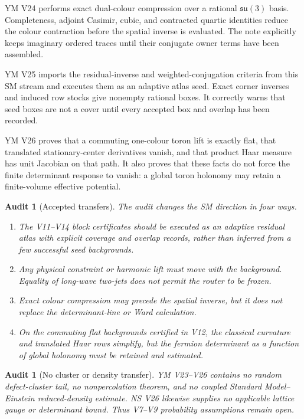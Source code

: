 \documentclass[11pt]{article}
\newtheorem{audit}[theorem]{Audit}
\begin{document}
YM V24 performs exact dual-colour compression over a rational
\(\mathfrak{su}(3)\) basis.  Completeness, adjoint Casimir, cubic, and
contracted quartic identities reduce the colour contraction before the
spatial inverse is evaluated.  The note explicitly keeps imaginary
ordered traces until their conjugate owner terms have been assembled.

YM V25 imports the residual-inverse and weighted-conjugation criteria from
this SM stream and executes them as an adaptive atlas seed.  Exact corner
inverses and induced row stocks give nonempty rational boxes.  It correctly
warns that seed boxes are not a cover until every accepted box and overlap
has been recorded.

YM V26 proves that a commuting one-colour toron lift is exactly flat,
that translated stationary-center derivatives vanish, and that product
Haar measure has unit Jacobian on that path.  It also proves that these
facts do not force the finite determinant response to vanish: a global
toron holonomy may retain a finite-volume effective potential.

\begin{audit}[Accepted transfers]
\label{audit:v11v15-accepted}
The audit changes the SM direction in four ways.
\begin{enumerate}[label=\textnormal{(\roman*)}]
\item The V11--V14 block certificates should be executed as an adaptive
residual atlas with explicit coverage and overlap records, rather than
inferred from a few successful seed backgrounds.
\item Any physical constraint or harmonic lift must move with the
background.  Equality of long-wave two-jets does not permit the router to
be frozen.
\item Exact colour compression may precede the spatial inverse, but it
does not replace the determinant-line or Ward calculation.
\item On the commuting flat backgrounds certified in V12, the classical
curvature and translated Haar rows simplify, but the fermion determinant
as a function of global holonomy must be retained and estimated.
\end{enumerate}
\end{audit}

\begin{audit}[No cluster or density transfer]
\label{audit:v11v15-no-cluster}
YM V23--V26 contains no random defect-cluster tail, no nonpercolation
theorem, and no coupled Standard Model--Einstein reduced-density estimate.
NS V26 likewise supplies no applicable lattice gauge or determinant
bound.  Thus V7--V9 probability assumptions remain open.
\end{audit}
\end{document}
